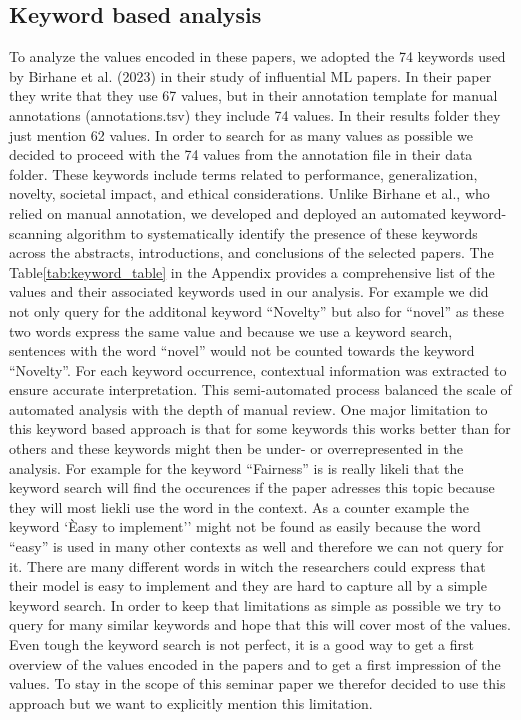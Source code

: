 \documentclass{article}
\begin{document}
\subsection{Keyword based analysis}
To analyze the values encoded in these papers, we adopted the 74 keywords used by Birhane et al. (2023) in their study of influential ML papers. In their paper
they write that they use 67 values, but in their annotation template for manual annotations (annotations.tsv) they include 74 values. In their results folder they
just mention 62 values. In order to search for as many values as possible we decided to proceed with the 74 values from the annotation file in their data folder.  
These keywords include terms related to performance, generalization, novelty, societal impact, and ethical considerations. 
Unlike Birhane et al., who relied on manual annotation, we developed and deployed an automated keyword-scanning algorithm to systematically identify the presence of 
these keywords across the abstracts, introductions, and conclusions of the selected papers.
The Table\ref{tab:keyword_table} in the Appendix provides a comprehensive list of the values and their associated keywords used in our analysis.
For example we did not only query for the additonal keyword ``Novelty'' but also for ``novel'' as these two
words express the same value and because we use a keyword search, sentences with the word ``novel'' would not be counted towards the keyword ``Novelty''.  
For each keyword occurrence, contextual information was extracted to ensure accurate interpretation. 
This semi-automated process balanced the scale of automated analysis with the depth of manual review. One major limitation to this keyword based approach is 
that for some keywords this works better than for others and these keywords might then be under- or overrepresented in the analysis. For example for the keyword ``Fairness'' is 
is really likeli that the keyword search will find the occurences if the paper adresses this topic because they will most liekli use the word in the context. 
As a counter example the keyword `Èasy to implement'' might not be found as easily because the word ``easy'' is used in many other contexts as well and therefore we can not query for it.
There are many different words in witch the researchers could express that their model is easy to implement and they are hard to capture all by a simple keyword search. In order to keep that limitations as simple as possible
we try to query for many similar keywords and hope that this will cover most of the values.
Even tough the keyword search is not perfect, it is a good way to get a first overview of the values encoded in the papers and to get a first impression of the values. To stay in the scope of this seminar paper 
we therefor decided to use this approach but we want to explicitly mention this limitation.
\end{document}
